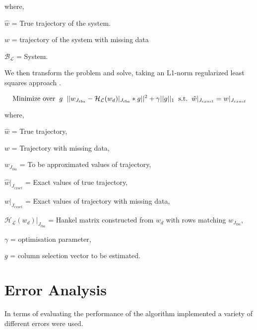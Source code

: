 \noindent where, 

$\hat{w}$ = True trajectory of the system. 

$w$ = trajectory of the system with missing data 

$\mathcal{B_L}$ = System. 

\clearpage

\noindent We then transform the problem and solve, taking an L1-norm regularized least squares approach \cite{markovsky}. 

\begin{equation}
    \label{eqn: opt}
    \text{Minimize over}\hspace{0.2cm} g \hspace{0.2cm} ||w_{J_{tba}}-\mathcal{H_L}(w_d)|_{J_{tba}}*g||^{2} + \gamma ||g||_1 \hspace{0.2cm}
    \text{s.t.} \hspace{0.2cm} \hat{w}|_{J_{exact}}=w|_{J_{exact}}
\end{equation}

\noindent where, 

$\hat{w}$ = True trajectory, 

$w$ = Trajectory with missing data, 

$w_{J_{tba}}$ = To be approximated values of trajectory, 

$\hat{w}|_{J_{exact}}$ = Exact values of true trajectory,

$w|_{J_{exact}}$ = Exact values of trajectory with missing data, 

$\mathcal{H_L}(w_d)|_{J_{tba}}$ = Hankel matrix constructed  from $w_d$ with rows matching $w_{J_{tba}}$,

$\gamma$ = optimisation parameter, 

$g$ = column selection vector to be estimated. 

\section{Error Analysis}
\label{section: errors}
\noindent In terms of evaluating the performance of the algorithm implemented a variety of different errors were used. 

